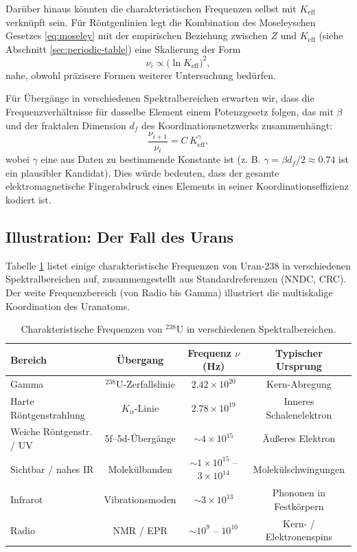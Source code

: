 \documentclass[12pt,a4paper]{article}
\begin{document}
	Darüber hinaus könnten die charakteristischen Frequenzen selbst mit \(K_{\mathrm{eff}}\) verknüpft sein. Für Röntgenlinien legt die Kombination des Moseleyschen Gesetzes \eqref{eq:moseley} mit der empirischen Beziehung zwischen \(Z\) und \(K_{\mathrm{eff}}\) (siehe Abschnitt \ref{sec:periodic-table}) eine Skalierung der Form
	\begin{equation}
		\nu_i \propto \bigl(\ln K_{\mathrm{eff}}\bigr)^2,
		\label{eq:freq_scaling}
	\end{equation}
	nahe, obwohl präzisere Formen weiterer Untersuchung bedürfen.
	
	Für Übergänge in verschiedenen Spektralbereichen erwarten wir, dass die Frequenzverhältnisse für dasselbe Element einem Potenzgesetz folgen, das mit \(\beta\) und der fraktalen Dimension \(d_f\) des Koordinationsnetzwerks zusammenhängt:
	\begin{equation}
		\frac{\nu_{i+1}}{\nu_i} = C \, K_{\mathrm{eff}}^{\gamma},
		\label{eq:ratio_scaling}
	\end{equation}
	wobei \(\gamma\) eine aus Daten zu bestimmende Konstante ist (z. B. \(\gamma = \beta d_f/2 \approx 0.74\) ist ein plausibler Kandidat). Dies würde bedeuten, dass der gesamte elektromagnetische Fingerabdruck eines Elements in seiner Koordinationseffizienz kodiert ist.
	
	\subsection{Illustration: Der Fall des Urans}
	
	Tabelle \ref{tab:uranium_spectrum} listet einige charakteristische Frequenzen von Uran-238 in verschiedenen Spektralbereichen auf, zusammengestellt aus Standardreferenzen (NNDC, CRC). Der weite Frequenzbereich (von Radio bis Gamma) illustriert die multiskalige Koordination des Uranatoms.
	
	\begin{table}[htbp]
		\centering
		\caption{Charakteristische Frequenzen von \(^{238}\mathrm{U}\) in verschiedenen Spektralbereichen.}
		\label{tab:uranium_spectrum}
		\begin{tabular}{@{}lccc@{}}
			\toprule
			\textbf{Bereich} & \textbf{Übergang} & \textbf{Frequenz \(\nu\) (Hz)} & \textbf{Typischer Ursprung} \\
			\midrule
			Gamma & \(^{238}\mathrm{U}\)-Zerfallslinie & \(2.42\times10^{20}\) & Kern-Abregung \\
			Harte Röntgenstrahlung & \(K_\alpha\)-Linie & \(2.78\times10^{19}\) & Inneres Schalenelektron \\
			Weiche Röntgenstr. / UV & 5f–5d-Übergänge & \(\sim 4\times10^{15}\) & Äußeres Elektron \\
			Sichtbar / nahes IR & Molekülbanden & \(\sim 1\times10^{15}\) – \(3\times10^{14}\) & Molekülschwingungen \\
			Infrarot & Vibrationsmoden & \(\sim 3\times10^{13}\) & Phononen in Festkörpern \\
			Radio & NMR / EPR & \(\sim 10^9\) – \(10^{10}\) & Kern- / Elektronenspins \\
			\bottomrule
		\end{tabular}
	\end{table}
	
\end{document}
